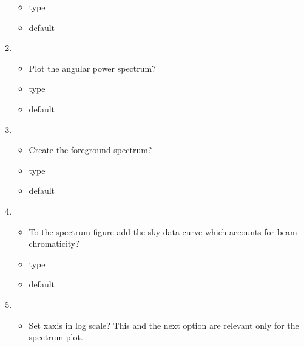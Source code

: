 \documentclass[letterpaper,10pt,english]{sphinxmanual}
\begin{document}
\begin{enumerate}
\begin{itemize}
\item {} 
\sphinxAtStartPar
type 

\item {} 
\sphinxAtStartPar
default 

\end{itemize}

\item {} 
\sphinxAtStartPar
{}
\begin{itemize}
\item {} 
\sphinxAtStartPar
Plot the angular power spectrum?

\item {} 
\sphinxAtStartPar
type 

\item {} 
\sphinxAtStartPar
default 

\end{itemize}

\item {} 
\sphinxAtStartPar
{}
\begin{itemize}
\item {} 
\sphinxAtStartPar
Create the foreground spectrum?

\item {} 
\sphinxAtStartPar
type 

\item {} 
\sphinxAtStartPar
default 

\end{itemize}

\item {} 
\sphinxAtStartPar
{}
\begin{itemize}
\item {} 
\sphinxAtStartPar
To the spectrum figure add the sky data curve which accounts for
beam chromaticity?

\item {} 
\sphinxAtStartPar
type 

\item {} 
\sphinxAtStartPar
default 

\end{itemize}

\item {} 
\sphinxAtStartPar
{}
\begin{itemize}
\item {} 
\sphinxAtStartPar
Set x\sphinxhyphen{}axis in log scale? This and the next option are relevant
only for the spectrum plot.


\end{itemize}
\end{enumerate}
\end{document}
